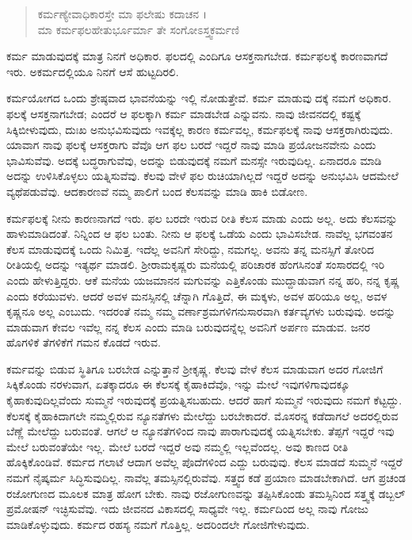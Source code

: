 \begin{verse}
ಕರ್ಮಣ್ಯೇವಾಧಿಕಾರಸ್ತೇ ಮಾ ಫಲೇಷು ಕದಾಚನ ।\\ಮಾ ಕರ್ಮಫಲಹೇತುರ್ಭೂರ್ಮಾ ತೇ ಸಂಗೋಽಸ್ತ್ವಕರ್ಮಣಿ 
\end{verse}

{\small ಕರ್ಮ ಮಾಡುವುದಕ್ಕೆ ಮಾತ್ರ ನಿನಗೆ ಅಧಿಕಾರ. ಫಲದಲ್ಲಿ ಎಂದಿಗೂ ಆಸಕ್ತನಾಗಬೇಡ. ಕರ್ಮಫಲಕ್ಕೆ ಕಾರಣವಾಗದೆ ಇರು. ಅಕರ್ಮದಲ್ಲಿಯೂ ನಿನಗೆ ಆಸೆ ಹುಟ್ಟದಿರಲಿ.}

ಕರ್ಮಯೋಗದ ಒಂದು ಶ್ರೇಷ್ಠವಾದ ಭಾವನೆಯನ್ನು ಇಲ್ಲಿ ನೋಡುತ್ತೇವೆ. ಕರ್ಮ ಮಾಡುವು ದಕ್ಕೆ ನಮಗೆ ಅಧಿಕಾರ. ಫಲಕ್ಕೆ ಆಸಕ್ತನಾಗಬೇಡ; ಎಂದರೆ ಆ ಫಲಕ್ಕಾಗಿ ಕರ್ಮ ಮಾಡಬೇಡ ಎನ್ನುವನು. ನಾವು ಜೀವನದಲ್ಲಿ ಕಷ್ಟಕ್ಕೆ ಸಿಕ್ಕಿಬೀಳುವುದು, ದುಃಖ ಅನುಭವಿಸುವುದು ಇವಕ್ಕೆಲ್ಲ ಕಾರಣ ಕರ್ಮವಲ್ಲ, ಕರ್ಮಫಲಕ್ಕೆ ನಾವು ಆಸಕ್ತರಾಗಿರುವುದು. ಯಾವಾಗ ನಾವು ಫಲಕ್ಕೆ ಆಸಕ್ತರಾಗು ವೆವೊ ಆಗ ಫಲ ಬರದೆ ಇದ್ದರೆ ನಾವು ಮಾಡಿ ಪ್ರಯೋಜನವೇನು ಎಂದು ಭಾವಿಸುವೆವು. ಅದಕ್ಕೆ ಬದ್ಧರಾಗುವೆವು, ಅದನ್ನು ಬಿಡುವುದಕ್ಕೆ ನಮಗೆ ಮನಸ್ಸೇ ಇರುವುದಿಲ್ಲ. ಏನಾದರೂ ಮಾಡಿ ಅದನ್ನು ಉಳಿಸಿಕೊಳ್ಳಲು ಯತ್ನಿಸುವೆವು. ಕೆಲವು ವೇಳೆ ಫಲ ರುಚಿಯಾಗಿಲ್ಲದೆ ಇದ್ದರೆ ಅದನ್ನು ಅನುಭವಿಸಿ ಆದಮೇಲೆ ವ್ಯಥೆಪಡುವೆವು. ಆದಕಾರಣವೆ ನಮ್ಮ ಪಾಲಿಗೆ ಬಂದ ಕೆಲಸವನ್ನು ಮಾಡಿ ಹಾಕಿ ಬಿಡೋಣ.

ಕರ್ಮಫಲಕ್ಕೆ ನೀನು ಕಾರಣನಾಗದೆ ಇರು. ಫಲ ಬರದೇ ಇರುವ ರೀತಿ ಕೆಲಸ ಮಾಡು ಎಂದು ಅಲ್ಲ. ಅದು ಕೆಲಸವನ್ನು ಹಾಳುಮಾಡಿದಂತೆ. ನಿನ್ನಿಂದ ಆ ಫಲ ಬಂತು. ನೀನು ಆ ಫಲಕ್ಕೆ ಒಡೆಯ ಎಂದು ಭಾವಿಸಬೇಡ. ನಾವೆಲ್ಲ ಭಗವಂತನ ಕೆಲಸ ಮಾಡುವುದಕ್ಕೆ ಒಂದು ನಿಮಿತ್ತ. ಇದೆಲ್ಲ ಅವನಿಗೆ ಸೇರಿದ್ದು, ನಮಗಲ್ಲ. ಅವನು ತನ್ನ ಮನಸ್ಸಿಗೆ ತೋರಿದ ರೀತಿಯಲ್ಲಿ ಅದನ್ನು ಇತ್ಯರ್ಥ ಮಾಡಲಿ. ಶ್ರೀರಾಮಕೃಷ್ಣರು ಮನೆಯಲ್ಲಿ ಪರಿಚಾರಕ ಹೆಂಗಸಿನಂತೆ ಸಂಸಾರದಲ್ಲಿ ಇರಿ ಎಂದು ಹೇಳುತ್ತಿದ್ದರು. ಆಕೆ ಮನೆಯ ಯಜಮಾನನ ಮಗುವನ್ನು ಎತ್ತಿಕೊಂಡು ಮುದ್ದಾಡುವಾಗ ನನ್ನ ಹರಿ, ನನ್ನ ಕೃಷ್ಣ ಎಂದು ಕರೆಯುವಳು. ಆದರೆ ಅವಳ ಮನಸ್ಸಿನಲ್ಲಿ ಚೆನ್ನಾಗಿ ಗೊತ್ತಿದೆ, ಈ ಮಕ್ಕಳು, ಅವಳ ಹರಿಯೂ ಅಲ್ಲ, ಅವಳ ಕೃಷ್ಣನೂ ಅಲ್ಲ ಎಂಬುದು. ಇದರಂತೆ ನಮ್ಮ ನಮ್ಮ ವರ್ಣಾಶ್ರಮಗಳಿಗನುಸಾರವಾಗಿ ಕರ್ತವ್ಯಗಳು ಬರುವುವು. ಅದನ್ನು ಮಾಡುವಾಗ ಕೇವಲ ಇವೆಲ್ಲ ನನ್ನ ಕೆಲಸ ಎಂದು ಮಾಡಿ ಬರುವುದನ್ನೆಲ್ಲ ಅವನಿಗೆ ಅರ್ಪಣ ಮಾಡುವ. ಜನರ ಹೊಗಳಿಕೆ ತೆಗಳಿಕೆಗೆ ಗಮನ ಕೊಡದೆ ಇರುವ.

ಕರ್ಮವನ್ನು ಬಿಡುವ ಸ್ಥಿತಿಗೂ ಬರಬೇಡ ಎನ್ನುತ್ತಾನೆ ಶ್ರೀಕೃಷ್ಣ. ಕೆಲವು ವೇಳೆ ಕೆಲಸ ಮಾಡುವಾಗ ಅದರ ಗೋಜಿಗೆ ಸಿಕ್ಕಿಕೊಂಡು ನರಳುವಾಗ, ಏತಕ್ಕಾದರೂ ಈ ಕೆಲಸಕ್ಕೆ ಕೈಹಾಕಿದೆವೊ, ಇನ್ನು ಮೇಲೆ ಇವುಗಳಿಗಾವುದಕ್ಕೂ ಕೈಹಾಕುವುದಿಲ್ಲವೆಂದು ಸುಮ್ಮನೆ ಇರುವುದಕ್ಕೆ ಪ್ರಯತ್ನಿಸಬಹುದು. ಆದರೆ ಹಾಗೆ ಸುಮ್ಮನೆ ಇರುವುದು ನಮಗೆ ಕೆಟ್ಟದ್ದು. ಕೆಲಸಕ್ಕೆ ಕೈಹಾಕಿದಾಗಲೇ ನಮ್ಮಲ್ಲಿರುವ ನ್ಯೂನತೆಗಳು ಮೇಲೆದ್ದು ಬರಬೇಕಾದರೆ. ಮೊಸರನ್ನ ಕಡೆದಾಗಲೆ ಅದರಲ್ಲಿರುವ ಬೆಣ್ಣೆ ಮೇಲೆದ್ದು ಬರುವಂತೆ. ಆಗಲೆ ಆ ನ್ಯೂನತೆಗಳಿಂದ ನಾವು ಪಾರಾಗುವುದಕ್ಕೆ ಯತ್ನಿಸಬೇಕು. ತೆಪ್ಪಗೆ ಇದ್ದರೆ ಇವು ಮೇಲೆ ಬರುವಂತೆಯೇ ಇಲ್ಲ. ಮೇಲೆ ಬರದೆ ಇದ್ದರೆ ಅವು ನಮ್ಮಲ್ಲಿ ಇಲ್ಲವೆಂದಲ್ಲ. ಅವು ಕಾಣದ ರೀತಿ ಹೊಕ್ಕಿಕೊಂಡಿವೆ. ಕರ್ಮದ ಗಲಾಟೆ ಆದಾಗ ಅವೆಲ್ಲ ಪೊದೆಗಳಿಂದ ಎದ್ದು ಬರುವುವು. ಕೆಲಸ ಮಾಡದೆ ಸುಮ್ಮನೆ ಇದ್ದರೆ ನಮಗೆ ನೈಷ್ಕರ್ಮ ಸಿದ್ಧಿಸುವುದಿಲ್ಲ. ನಾವೆಲ್ಲ ತಮಸ್ಸಿನಲ್ಲಿರುವೆವು. ಸತ್ತ್ವದ ಕಡೆ ಪ್ರಯಾಣ ಮಾಡಬೇಕಾಗಿದೆ. ಆಗ ಪ್ರಚಂಡ ರಜೋಗುಣದ ಮೂಲಕ ಮಾತ್ರ ಹೋಗ ಬೇಕು. ನಾವು ರಜೋಗುಣವನ್ನು ತಪ್ಪಿಸಿಕೊಂಡು ತಮಸ್ಸಿನಿಂದ ಸತ್ತ್ವಕ್ಕೆ ಡಬ್ಬಲ್ ಪ್ರಮೋಷನ್ ಇಚ್ಛಿಸುವೆವು. ಇದು ಜೀವನದ ವಿಕಾಸದಲ್ಲಿ ಸಾಧ್ಯವೇ ಇಲ್ಲ. ಕರ್ಮದಿಂದ ಅಲ್ಲ ನಾವು ಗೋಜು ಮಾಡಿಕೊಳ್ಳುವುದು. ಕರ್ಮದ ರಹಸ್ಯ ನಮಗೆ ಗೊತ್ತಿಲ್ಲ. ಅದರಿಂದಲೇ ಗೋಜಿಗೇಳುವುದು.

